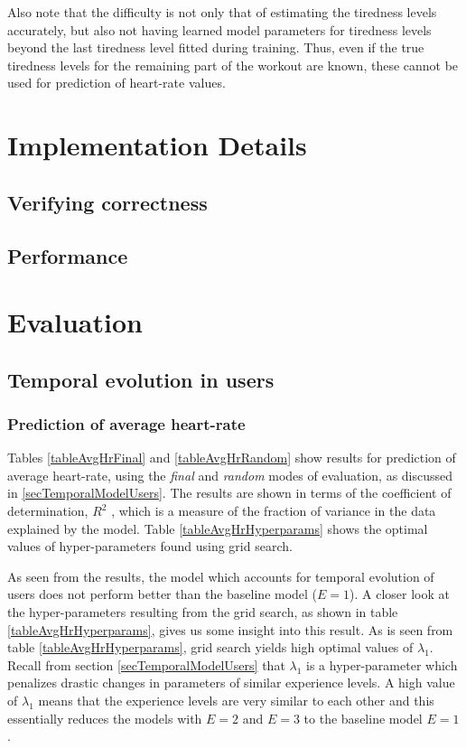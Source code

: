 \documentclass{acm_proc_article-sp}
\begin{document}
Also note that the difficulty is not only that of estimating the tiredness levels accurately, but also not having learned model parameters for tiredness levels beyond the last tiredness level fitted during training. Thus, even if the true tiredness levels for the remaining part of the workout are known, these cannot be used for prediction of heart-rate values.

\section{Implementation Details}
\subsection{Verifying correctness}
\subsection{Performance}

\section{Evaluation}
\label{secEvaluation}

\subsection{Temporal evolution in users}

\subsubsection{Prediction of average heart-rate}

Tables \ref{tableAvgHrFinal} and \ref{tableAvgHrRandom} show results for prediction of average heart-rate, using the  \emph{final} and \emph{random} modes of evaluation, as discussed in \ref{secTemporalModelUsers}. The results are shown in terms of the coefficient of determination, $R^2$ \cite{r2Wiki}, which is a measure of the fraction of variance in the data explained by the model. Table \ref{tableAvgHrHyperparams} shows the optimal values of hyper-parameters found using grid search.

As seen from the results, the model which accounts for temporal evolution of users does not perform better than the baseline model ($E = 1$). A closer look at the hyper-parameters resulting from the grid search, as shown in table \ref{tableAvgHrHyperparams}, gives us some insight into this result. As is seen from table \ref{tableAvgHrHyperparams}, grid search yields high optimal values of $\lambda_1$. Recall from section \ref{secTemporalModelUsers} that $\lambda_1$ is a hyper-parameter which penalizes drastic changes in parameters of similar experience levels. A high value of $\lambda_1$ means that the experience levels are very similar to each other and this essentially reduces the models with $E = 2$ and $E = 3$ to the baseline model $E = 1$.
\end{document}
